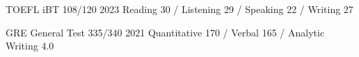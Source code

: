 


\begin{cvhonors}

    \cvhonor
        {TOEFL iBT}
        {108/120}
        {}{2023}
    \cvhonordescription
        {Reading 30 / Listening 29 / Speaking 22 / Writing 27}{}
        
    \cvhonor
        {GRE General Test}
        {335/340}
        {}{2021}
    \cvhonordescription
        {Quantitative 170 / Verbal 165 / Analytic Writing 4.0}{}

\end{cvhonors}

